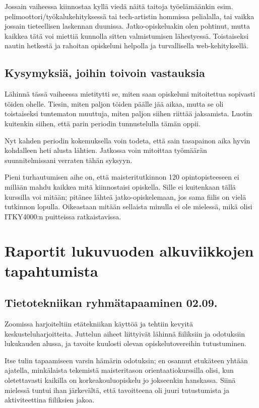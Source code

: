 \documentclass[utf8]{gradu3}
\begin{document}
Jossain vaiheessa kiinnostaa kyllä viedä näitä taitoja työelämäänkin esim.
pelimoottori/työkalukehityksessä tai tech-artistin hommissa pelialalla, tai
vaikka jossain tieteellisen laskennan duunissa. Jatko-opiskeluakin olen
poh\-tinut, mutta kaikkea tätä voi miettiä kunnolla sitten valmistumisen
lähestyessä. Toistaiseksi nautin hetkestä ja rahoitan opiskeluni helpolla ja
turvallisella web-kehityksellä.

\section{Kysymyksiä, joihin toivoin vastauksia} Lähinnä tässä vaiheessa
mietitytti se, miten saan opiskeluni mitoitettua sopivasti töiden ohelle.
Tiesin, miten paljon töiden päälle jää aikaa, mutta se oli toistaiseksi
tuntematon muuttuja, miten paljon siihen riittää jaksamista. Luotin kuitenkin
siihen, että parin periodin tunnustelulla tämän oppii.

Nyt kahden periodin kokemuksella voin todeta, että sain tasapainon aika hyvin
kohdalleen heti alusta lähtien. Jatkossa voin mitoittaa työmäärän
suunnitelmissani verraten tähän syksyyn.

Pieni turhautumisen aihe on, että maisteritutkinnon 120 opintopisteeseen ei
millään mahdu kaikkea mitä kiinnostaisi opiskella. Sille ei kuitenkaan tällä
kurssilla voi mitään; pitänee lähteä jatko-opiskelemaan, jos sama fiilis on
vielä tutkinnon lopulla. Oikeastaan mitään sellaista minulla ei ole mielessä,
mikä olisi ITKY4000:n puitteissa ratkaistavissa.

\chapter{Raportit lukuvuoden alkuviikkojen tapahtumista}
\label{tapahtumaraportit}

\section{Tietotekniikan ryhmätapaaminen 02.09.}

Zoomissa harjoiteltiin etätekniikan käyttöä ja tehtiin kevyitä
keskusteluharjoitteita. Juttelun aiheet liittyivät lähinnä fiiliksiin ja
odotuksiin lukukauden alussa, ja tavoite kuulosti olevan opiskelutovereihin
tutustuminen.

Itse tulin tapaamiseen varsin hämärin odotuksin; en osannut etukäteen yhtään
ajatella, minkälaista tekemistä maisteritason orientaatiokurssilla olisi, kun
oletettavasti kaikilla on korkeakouluopiskelu jo jokseenkin hanskassa. Siinä
mielessä tuntui ihan järkevältä, että tavoitteena oli juuri tutustumista ja
aktiviteettina fiiliksien jakoa.
\end{document}

